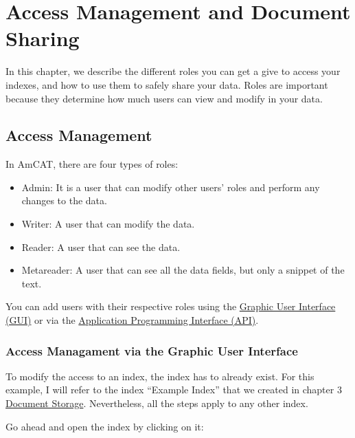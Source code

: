 \documentclass[
  letterpaper,
  DIV=11,
  numbers=noendperiod]{scrreprt}
\providecommand{\tightlist}{%
  \setlength{\itemsep}{0pt}\setlength{\parskip}{0pt}}\usepackage{longtable,booktabs,array}
\begin{document}

\chapter{Access Management and Document
Sharing}\label{access-management-and-document-sharing}

In this chapter, we describe the different roles you can get a give to
access your indexes, and how to use them to safely share your data.
Roles are important because they determine how much users can view and
modify in your data.

\section{Access Management}\label{access-management}

In AmCAT, there are four types of roles:

\begin{itemize}
\tightlist
\item
  Admin: It is a user that can modify other users' roles and perform any
  changes to the data.
\item
  Writer: A user that can modify the data.
\item
  Reader: A user that can see the data.
\item
  Metareader: A user that can see all the data fields, but only a
  snippet of the text.
\end{itemize}

You can add users with their respective roles using the
\hyperref[access-managament-via-the-graphic-user-interface]{Graphic User
Interface (GUI)} or via the
\hyperref[access-managament-via-the-application-programming-interface]{Application
Programming Interface (API)}.

\subsection{Access Managament via the Graphic User
Interface}\label{access-managament-via-the-graphic-user-interface}

To modify the access to an index, the index has to already exist. For
this example, I will refer to the index ``Example Index'' that we
created in chapter 3 \hyperref[03._storage]{Document Storage}.
Nevertheless, all the steps apply to any other index.

Go ahead and open the index by clicking on it:
\end{document}
